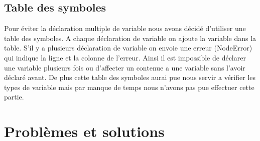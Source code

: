 \documentclass[10pt,a4paper]{report}
\begin{document}
\subsection{Table des symboles}
Pour éviter la déclaration multiple de variable nous avons décidé d'utiliser une table des symboles. A chaque déclaration de variable on ajoute la variable dans la table.
S'il y a plusieurs déclaration de variable on envoie une erreur (NodeError) qui indique la ligne et la colonne de l'erreur.
Ainsi il est impossible de déclarer une variable plusieurs fois ou d'affecter un contenue a une variable sans l'avoir déclaré avant.
De plus cette table des symboles aurai pue nous servir a vérifier les types de variable mais par manque de temps nous n'avons pas pue effectuer cette partie.

\section{Problèmes et solutions}
\end{document}
